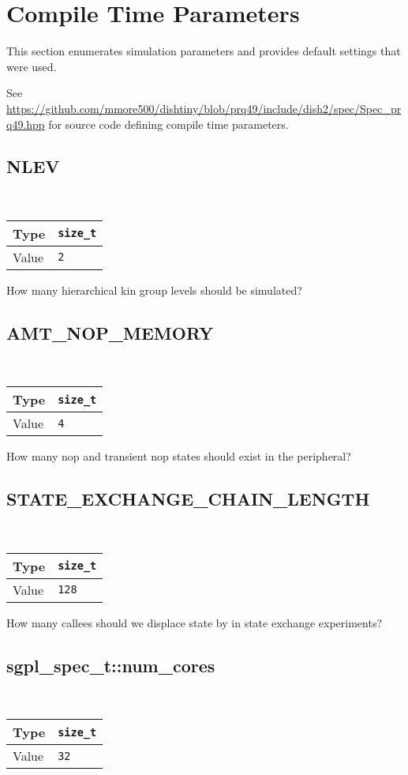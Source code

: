 \section{Compile Time Parameters}

\newcommand{\paramcompiletimedef}[2]{
    ~\\ \begin{tabularx}{\linewidth}{|
        >{\columncolor[HTML]{C0C0C0}}l |X|}
        \hline
        Type & \texttt{#1} \\ \hline
        Value   & \texttt{#2} \\ \hline
    \end{tabularx}
}

This section enumerates simulation parameters and provides default settings that were used.

See \url{https://github.com/mmore500/dishtiny/blob/prq49/include/dish2/spec/Spec_prq49.hpp} for source code defining compile time parameters.

\subsection{NLEV}

\paramcompiletimedef{size\_t}{2}

How many hierarchical kin group levels should be simulated?

\subsection{AMT\_NOP\_MEMORY}

\paramcompiletimedef{size\_t}{4}

How many nop and transient nop states should exist in the peripheral?

\subsection{STATE\_EXCHANGE\_CHAIN\_LENGTH}

\paramcompiletimedef{size\_t}{128}

How many callees should we displace state by in state exchange experiments?

\subsection{sgpl\_spec\_t::num\_cores}

\paramcompiletimedef{size\_t}{32}

